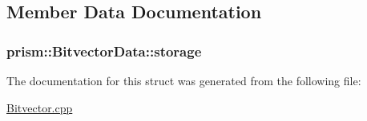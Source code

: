 \subsection{Member Data Documentation}
\subsubsection[{\texorpdfstring{storage}{storage}}]{ prism\+::\+Bitvector\+Data\+::storage}\hypertarget{structprism_1_1_bitvector_data_abcf70b2679d4c52bf398a1a308aca5c2}{}\label{structprism_1_1_bitvector_data_abcf70b2679d4c52bf398a1a308aca5c2}


The documentation for this struct was generated from the following file\+:\begin{DoxyCompactItemize}
\item 
\hyperlink{_bitvector_8cpp}{Bitvector.\+cpp}\end{DoxyCompactItemize}
